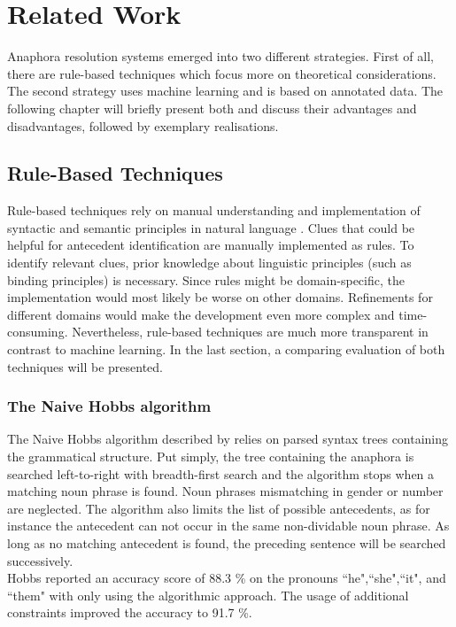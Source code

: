 \chapter{Related Work}
\label{sec:Related Work}

Anaphora resolution systems emerged into two different strategies. First of all, there are rule-based techniques which focus more on theoretical considerations. The second strategy uses machine learning and is based on annotated data. The following chapter will briefly present both and discuss their advantages and disadvantages, followed by exemplary realisations.

\section{Rule-Based Techniques}
Rule-based techniques rely on manual understanding and implementation of syntactic and semantic principles in natural language \citep{kennedy1996anaphora,mitkov1994integrated,ingria1989computational}. Clues that could be helpful for antecedent identification are manually implemented as rules. To identify relevant clues, prior knowledge about linguistic principles (such as binding principles) is necessary. Since rules might be domain-specific, the implementation would most likely be worse on other domains. Refinements for different domains would make the development even more complex and time-consuming. Nevertheless, rule-based techniques are much more transparent in contrast to machine learning. In the last section, a comparing evaluation of both techniques will be presented.



\subsection{The Naive Hobbs algorithm}
The Naive Hobbs algorithm described by \citep{hobbs1978resolving} relies on parsed syntax trees containing the grammatical structure. Put simply, the tree containing the anaphora is searched left-to-right with breadth-first search and the algorithm stops when a matching noun phrase is found. Noun phrases mismatching in gender or number are neglected. The algorithm also limits the list of possible antecedents, as for instance the antecedent can not occur in the same non-dividable noun phrase. As long as no matching antecedent is found, the preceding sentence will be searched successively. \\
Hobbs reported an accuracy score of 88.3 \% on the pronouns “he",“she",“it", and “them" with only using the algorithmic approach. The usage of additional constraints improved the accuracy to 91.7 \%.

